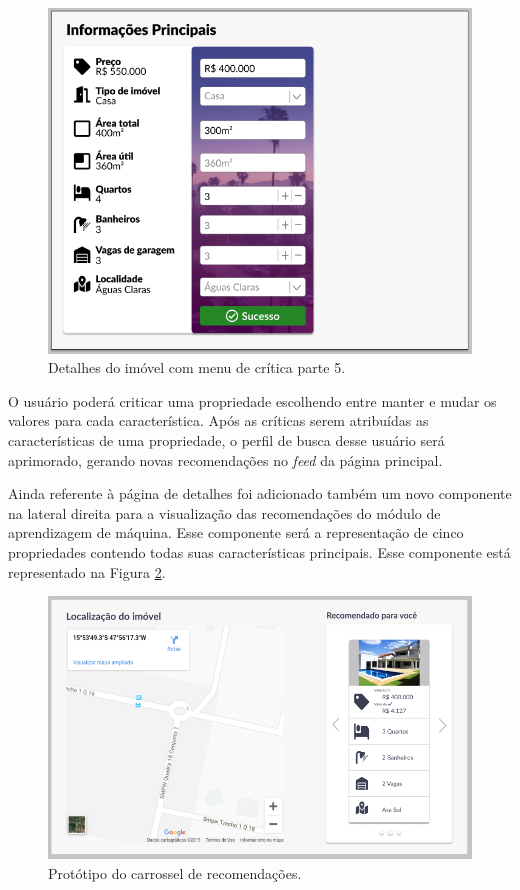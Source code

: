 \begin{figure}[H]
    \centering
    \includegraphics[scale=0.5]{figuras/proposta/prototipo5.jpg}
    \caption[Detalhes do imóvel com menu de crítica parte 5]{Detalhes do imóvel com menu de crítica parte 5.}
    \label{fig:prototipo_critico5}
\end{figure}

O usuário poderá criticar uma propriedade escolhendo entre manter e mudar os valores para cada característica. Após as críticas serem atribuídas as características de uma propriedade, o perfil de busca desse usuário será aprimorado, gerando novas recomendações no \textit{feed} da página principal.

Ainda referente à página de detalhes foi adicionado também um novo componente na lateral direita para a visualização das recomendações do módulo de aprendizagem de máquina. Esse componente será a representação de cinco propriedades contendo todas suas características principais. Esse componente está representado na Figura \ref{fig:prototipo_recommender_system}.

\begin{figure}[H]
    \centering
    \includegraphics[scale=0.53]{figuras/proposta/prototipo_recommender_system.png}
    \caption[Protótipo do carrossel de recomendações]{Protótipo do carrossel de recomendações.}
    \label{fig:prototipo_recommender_system}
\end{figure}

